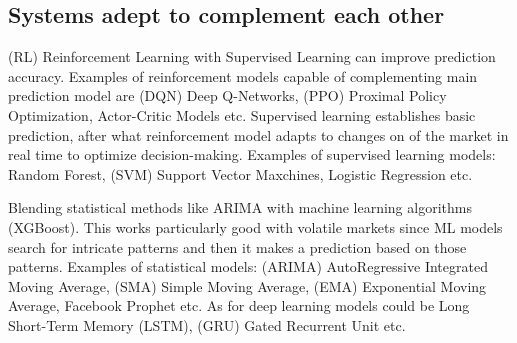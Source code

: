 \documentclass[10pt,twoside,english,a4paper]{article}
\begin{document}
\subsection{Systems adept to complement each other}
 (RL) Reinforcement Learning with Supervised Learning can improve prediction accuracy. Examples of reinforcement models capable of complementing main prediction model are (DQN) Deep Q-Networks, (PPO) Proximal Policy Optimization, Actor-Critic Models etc. Supervised learning establishes basic prediction, after what reinforcement model adapts to changes on of the market in real time to optimize decision-making. Examples of supervised learning models: Random Forest, (SVM) Support Vector Maxchines, Logistic Regression etc.
 \par Blending statistical methods like ARIMA with machine learning algorithms (XGBoost). This works particularly good with volatile markets since ML models search for intricate patterns and then it makes a prediction based on those patterns. Examples of statistical models: (ARIMA) AutoRegressive Integrated Moving Average, (SMA) Simple Moving Average, (EMA) Exponential Moving Average, Facebook Prophet etc. As for deep learning models could be Long Short-Term Memory (LSTM), (GRU) Gated Recurrent Unit etc. \cite{adept_sys}\cite{adept_sys1}\cite{adept_sys2}\cite{adept_sys3}

\newpage



\end{document}
